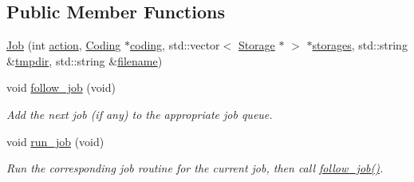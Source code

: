 \subsection*{\-Public \-Member \-Functions}
\begin{DoxyCompactItemize}
\item 
\hyperlink{classJob_ac4915b7a68b2b4e6bf57c336e18abe63}{\-Job} (int \hyperlink{classJob_a5ac6c3e826332838d56cfb647b894179}{action}, \hyperlink{classCoding}{\-Coding} $\ast$\hyperlink{classJob_ad78a9a8f3f37b373f0b9212e50e47161}{coding}, std\-::vector$<$ \hyperlink{classStorage}{\-Storage} $\ast$ $>$ $\ast$\hyperlink{classJob_ad53e461116a332c139528df7899f0a9e}{storages}, std\-::string \&\hyperlink{classJob_a1222a22533b8e17d4e75e2f9b5cecaab}{tmpdir}, std\-::string \&\hyperlink{classJob_a7611809399acfa1a39f824ff0ad04c21}{filename})
\item 
void \hyperlink{classJob_a9f3dfcff17ca8458dfda34d0845a95ef}{follow\-\_\-job} (void)
\begin{DoxyCompactList}\small\item\em \-Add the next job (if any) to the appropriate job queue. \end{DoxyCompactList}\item 
void \hyperlink{classJob_a08bb941ff2cb16eaaa98c1eb35771680}{run\-\_\-job} (void)
\begin{DoxyCompactList}\small\item\em \-Run the corresponding job routine for the current job, then call \hyperlink{classJob_a9f3dfcff17ca8458dfda34d0845a95ef}{follow\-\_\-job()}. \end{DoxyCompactList}\end{DoxyCompactItemize}
